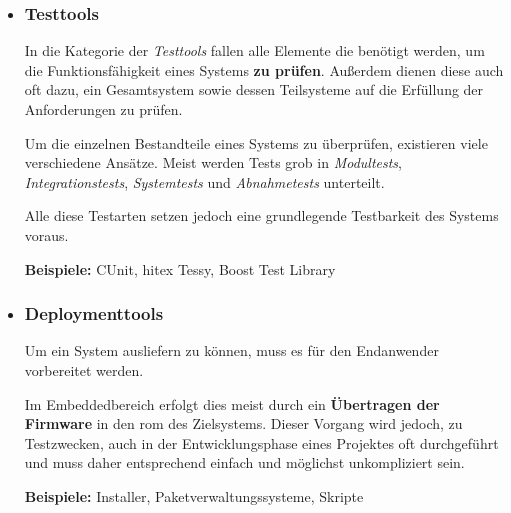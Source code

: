 \begin{itemize}
  Der Entwickler ist durch das Setzen von Breakpoints\footnote{Willkürliche,
  vom Entwickler vor dem Start der Software zu setzende, "`Haltepunkte"' im
  Programmablauf.} mittels des \emph{Debuggers} in der Lage, das System bis zu
  einem festgelegten Systemzustand laufen zu lassen. Anschließend kann
  er den weiteren Programmablauf schrittweise ausführen (single-stepping)
  oder mitunter auch geringfügige Änderung am Speicher des Systems vornehmen.
  Außerdem sind die meisten \emph{Debugger} in der Lage, das Zielsystem
  zurückzusetzen und so einen definierten Ausgangszustand herzustellen.
  
  Debugger sind in integrierten Systemen oft auf eine hohe Hardwareunterstützung
  angewiesen. In \autoref{subs:hwdebugger} wird dies näher beschrieben.
  
  \textbf{Beispiele:} GDB , IDB (Intel Debugger), Valgrind
  \item \subsubsection*{Testtools} In die Kategorie der \emph{Testtools} fallen
  alle Elemente die benötigt werden, um die Funktionsfähigkeit eines Systems
  \textbf{zu prüfen}. Außerdem dienen diese auch oft dazu, ein Gesamtsystem
  sowie dessen Teilsysteme auf die Erfüllung der Anforderungen zu prüfen.
  
  Um die einzelnen Bestandteile eines Systems zu überprüfen, existieren viele
  verschiedene Ansätze. Meist werden Tests grob in \emph{Modultests},
  \emph{Integrationstests}, \emph{Systemtests} und \emph{Abnahmetests}
  unterteilt.
  
  Alle diese Testarten setzen jedoch eine grundlegende Testbarkeit des Systems
  voraus.
  
  \textbf{Beispiele:} CUnit, hitex Tessy, Boost Test Library  
  \item \subsubsection*{Deploymenttools}\label{subs:deployment} Um ein System
  ausliefern zu können, muss es für den Endanwender vorbereitet werden.
  
  Im Embeddedbereich erfolgt dies meist durch ein \textbf{Übertragen der
  Firmware} in den \gls{rom} des Zielsystems. Dieser Vorgang wird jedoch, zu
  Testzwecken, auch in der Entwicklungsphase eines Projektes oft durchgeführt
  und muss daher entsprechend einfach und möglichst unkompliziert sein.
  
  \textbf{Beispiele:} Installer, Paketverwaltungssysteme, Skripte
\end{itemize}

